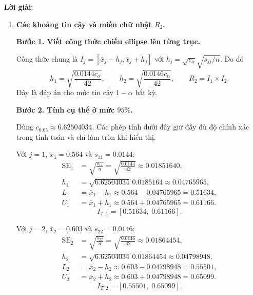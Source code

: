 \documentclass[11pt,a4paper]{article}
\newenvironment{solution}{%
  \par\medskip\noindent\textbf{Lời giải:}\par\nobreak\smallskip\noindent\ignorespaces
}{\par}
\newcommand{\answer}[1]{\boxed{#1}}
\newcommand{\step}[2]{\par\medskip\noindent\textbf{Bước #1. #2}\par\nopagebreak[4]\smallskip\noindent}
\begin{document}
\begin{solution}
\begin{enumerate}[label=\textbf{\alph*)}]
\[\]
\item \textbf{Các khoảng tin cậy và miền chữ nhật $R_2$.}\par\nopagebreak[4]
\step{1}{Viết công thức chiếu ellipse lên từng trục.}
Công thức chung là $I_j=[\bar{x}_j-h_j,\bar{x}_j+h_j]$ với
$h_j=\sqrt{c_\alpha}\sqrt{s_{jj}/n}$. Do đó
\[
h_1=\sqrt{\frac{0.0144c_\alpha}{42}},\qquad
h_2=\sqrt{\frac{0.0146c_\alpha}{42}},\qquad
R_2=I_1\times I_2.
\]
Đây là đáp án cho mức tin cậy $1-\alpha$ bất kỳ.
\step{2}{Tính cụ thể ở mức $95\%$.}
Dùng $c_{0.05}\approx6.62504034$. Các phép tính dưới đây giữ đầy đủ
độ chính xác trong tính toán và chỉ làm tròn khi hiển thị.
\begin{samepage}
Với $j=1$, $\bar{x}_1=0.564$ và $s_{11}=0.0144$:
\begin{align*}
\operatorname{SE}_{1}&=\sqrt{\frac{s_{11}}{n}}
=\sqrt{\frac{0.0144}{42}}\approx0.01851640,\\
h_{1}&=\sqrt{6.62504034}\,0.0185164\approx0.04765965,\\
L_{1}&=\bar{x}_{1}-h_{1}
\approx 0.564-0.04765965=0.51634,\\
U_{1}&=\bar{x}_{1}+h_{1}
\approx 0.564+0.04765965=0.61166.
\end{align*}
\[
\answer{I_{T,1}=[0.51634,\;0.61166]}.
\]
\end{samepage}

\begin{samepage}
Với $j=2$, $\bar{x}_2=0.603$ và $s_{22}=0.0146$:
\begin{align*}
\operatorname{SE}_{2}&=\sqrt{\frac{s_{22}}{n}}
=\sqrt{\frac{0.0146}{42}}\approx0.01864454,\\
h_{2}&=\sqrt{6.62504034}\,0.01864454\approx0.04798948,\\
L_{2}&=\bar{x}_{2}-h_{2}
\approx 0.603-0.04798948=0.55501,\\
U_{2}&=\bar{x}_{2}+h_{2}
\approx 0.603+0.04798948=0.65099.
\end{align*}
\[
\answer{I_{T,2}=[0.55501,\;0.65099]}.
\]
\end{samepage}


\end{enumerate}
\end{solution}
\end{document}
